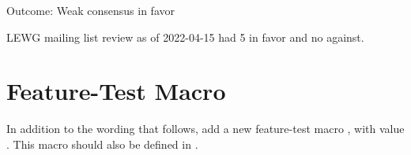 \documentclass[ebook,10pt,oneside,openany,final]{memoir}
\begin{document}
Outcome: Weak consensus in favor

LEWG mailing list review as of 2022-04-15 had 5 in favor and no against.

\section{Feature-Test Macro}

In addition to the wording that follows, add a new feature-test macro
, with value .  This macro should also be
defined in .

\newcommand{\indexhdr}[1]{}
\newcommand{\indexlibrarymember}[2]{
}




\end{document}
